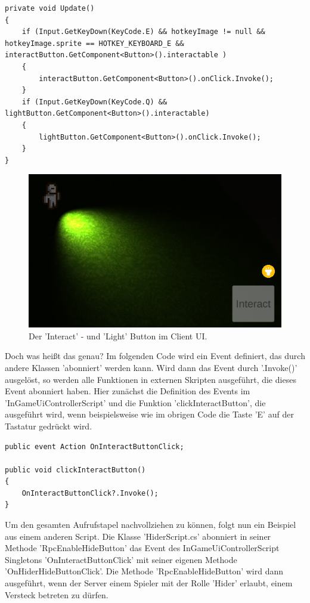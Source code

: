 \begin{lstlisting}[caption= InGameUiControllerScript.cs Update Method]
private void Update()
{
	if (Input.GetKeyDown(KeyCode.E) && hotkeyImage != null && hotkeyImage.sprite == HOTKEY_KEYBOARD_E && interactButton.GetComponent<Button>().interactable )
	{
		interactButton.GetComponent<Button>().onClick.Invoke();
	}
	if (Input.GetKeyDown(KeyCode.Q) && lightButton.GetComponent<Button>().interactable)
	{
		lightButton.GetComponent<Button>().onClick.Invoke();
	}
}
\end{lstlisting}

\begin{figure}[H]
	\centering
	\includegraphics[width=120mm]{images/prototyp_interact_light_button.png}
	\caption[Interact and Light Button]{Der 'Interact' - und 'Light' Button im Client UI.}
	\label{pic:prototyp_interact_light_button}
\end{figure}

Doch was heißt das genau? Im folgenden Code wird ein Event definiert, das durch andere Klassen 'abonniert' werden kann. Wird dann das Event durch '.Invoke()' ausgelöst, so werden alle Funktionen in externen Skripten ausgeführt, die dieses Event abonniert haben. Hier zunächst die Definition des Events im 'InGameUiControllerScript' und die Funktion 'clickInteractButton', die ausgeführt wird, wenn beispielsweise wie im obrigen Code die Taste 'E' auf der Tastatur gedrückt wird.

\begin{lstlisting}[caption= InGameUiControllerScript.cs OnInteractButtonClick Event]
public event Action OnInteractButtonClick;	

public void clickInteractButton()
{
	OnInteractButtonClick?.Invoke();
}
\end{lstlisting}

Um den gesamten Aufrufstapel nachvollziehen zu können, folgt nun ein Beispiel aus einem anderen Script.
Die Klasse 'HiderScript.cs' abonniert in seiner Methode 'RpcEnableHideButton' das Event des InGameUiControllerScript Singletons 'OnInteractButtonClick' mit seiner eigenen Methode 'OnHiderHideButtonClick'. Die Methode 'RpcEnableHideButton' wird dann ausgeführt, wenn der Server einem Spieler mit der Rolle 'Hider' erlaubt, einem Versteck betreten zu dürfen.

